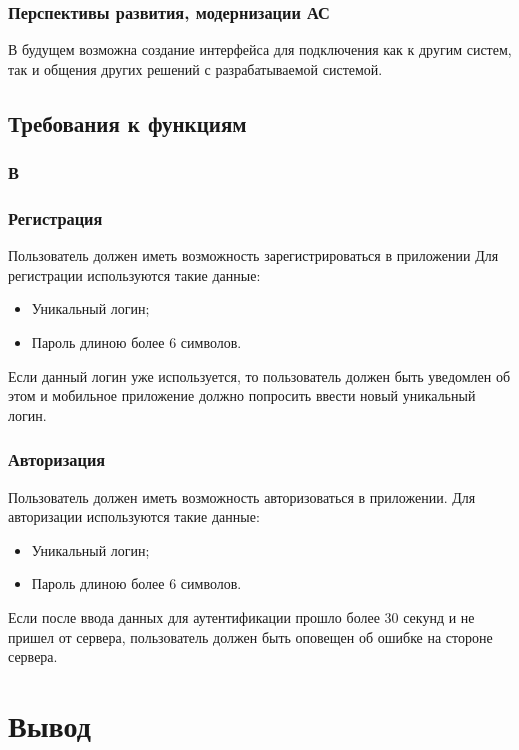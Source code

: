 \subsubsection{Перспективы развития, модернизации АС}
В будущем возможна создание интерфейса для подключения как к другим систем, так и общения других решений с
разрабатываемой системой.

\subsection{Требования к функциям}\label{subsec:func:treb}


\subsubsection{В}

\subsubsection{Регистрация}
Пользователь должен иметь возможность зарегистрироваться в приложении
Для регистрации используются такие данные:
\begin{itemize}
    \item Уникальный логин;
    \item Пароль длиною более 6 символов.
\end{itemize}
Если данный логин уже используется, то пользователь должен быть уведомлен об этом и мобильное приложение должно
попросить ввести новый уникальный логин.

\subsubsection{Авторизация}
Пользователь должен иметь возможность авторизоваться в приложении.
Для авторизации используются такие данные:
\begin{itemize}
    \item Уникальный логин;
    \item Пароль длиною более 6 символов.
\end{itemize}
Если после ввода данных для аутентификации прошло более 30 секунд и не пришел от сервера, пользователь должен быть
оповещен об ошибке на стороне сервера.



\section*{\LARGE Вывод}

